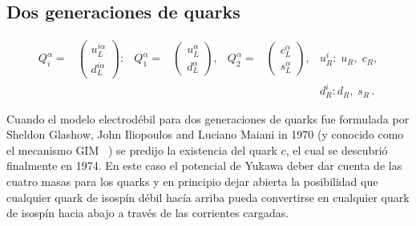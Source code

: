 \subsection{Dos generaciones de quarks}

\begin{frame}
\begin{align}
  Q_i^\alpha=&
\begin{pmatrix}
  u^{i\alpha}_L\\
  d^{i\alpha}_L
\end{pmatrix}:&
  Q_1^\alpha=&
  \begin{pmatrix}
    u^\alpha_L\\
    d^\alpha_L
  \end{pmatrix},&  Q_2^\alpha=&
  \begin{pmatrix}
    c^\alpha_L\\
    s^\alpha_L
  \end{pmatrix},& u_R^i:\;u_R,\;c_R,\nonumber\\
&&&&&&d_R^i:d_R,\;s_R\,.
\end{align}
\end{frame}
Cuando el modelo electrodébil para dos generaciones de quarks fue formulada por Sheldon Glashow, John Iliopoulos and Luciano Maiani in 1970 (y conocido como el mecanismo GIM~\cite{} ) se predijo la existencia del quark $c$, el cual se descubrió finalmente en 1974. En este caso el potencial de Yukawa deber dar cuenta de las cuatro masas para los quarks y en principio dejar abierta la
posibilidad que cualquier quark de isospín débil hacía arriba pueda convertirse en cualquier quark de isospín hacia abajo a través de las corrientes cargadas.

